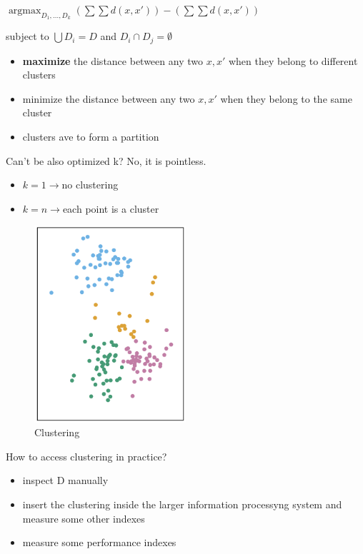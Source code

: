 \begin{center}
    $\operatorname*{argmax}_{D_1,\dots,D_k}(\sum \sum d(x,x'))-(\sum\sum d(x,x'))$

    subject to $\bigcup D_i = D$ and $D_i \cap D_j = \emptyset$
\end{center}

\begin{itemize}
    \item \textbf{maximize} the distance between any two $x,x'$ when they belong to different clusters
    \item minimize the distance between any two $x,x'$ when they belong to the same cluster
    \item clusters ave to form a partition
\end{itemize}

Can't be also optimized k? No, it is pointless.
\begin{itemize}
    \item $k = 1 \to $no clustering
    \item $k = n \to $each point is a cluster
\end{itemize}

\begin{figure}[H]
    \centering
    \includegraphics[width=0.5\textwidth]{assets/fig35.png}
    \caption{Clustering}
\end{figure}

How to access clustering in practice?
\begin{itemize}
    \item inspect D manually
    \item insert the clustering inside the larger information processyng system and measure some other indexes
    \item measure some performance indexes 
\end{itemize}

